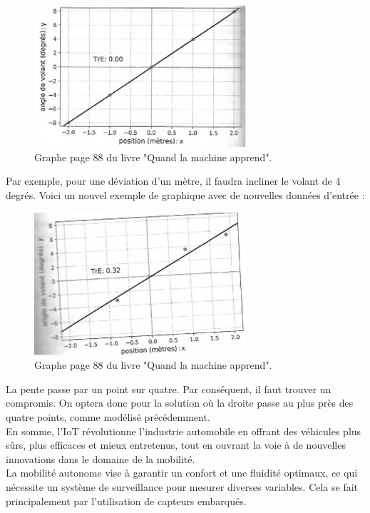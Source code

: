 \begin{figure}[H]
    \centering
    \includegraphics[width=0.7\textwidth]{images/graph1_yannLeCun.png} 
    \caption{Graphe page 88 du livre "Quand la machine apprend".}
\end{figure}
Par exemple, pour une déviation d’un mètre, il faudra incliner le volant de 4 degrés. 
Voici un nouvel exemple de graphique avec de nouvelles données d’entrée :
\begin{figure}[H]
    \centering
    \includegraphics[width=0.7\textwidth]{images/graph2_yannLeCun.jpg} 
    \caption{Graphe page 88 du livre "Quand la machine apprend".}
\end{figure}
La pente passe par un point sur quatre. Par conséquent, il faut trouver un compromis. On optera donc pour la solution où la droite passe au plus près des quatre points, comme modélisé précédemment. \\
En somme, l’IoT révolutionne l’industrie automobile en offrant des véhicules plus sûrs, plus efficaces et mieux entretenus, tout en ouvrant la voie à de nouvelles innovations dans le domaine de la mobilité.\\
La mobilité autonome vise à garantir un confort et une fluidité optimaux, ce qui nécessite un système de surveillance pour mesurer diverses variables. Cela se fait principalement par l'utilisation de capteurs embarqués.\\
